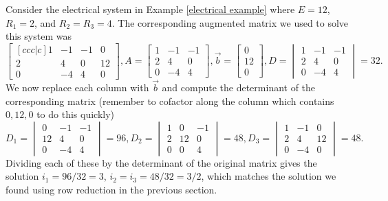 \begin{example}
Consider the electrical system in Example \ref{electrical example} where $E=12$, $R_1=2$, and $R_2=R_3=4$. 
The corresponding augmented matrix we used to solve this system was 
$$
\begin{bmatrix}[ccc|c]
1&-1&-1&0\\
2&4&0&12\\
0&-4&4&0
\end{bmatrix}, 
A=
\begin{bmatrix}1&-1&-1\\2&4&0\\0&-4&4\end{bmatrix}, 
\vec b=\begin{bmatrix}
0\\
12\\
0
\end{bmatrix},D=\begin{vmatrix} 1&-1&-1\\2&4&0\\0&-4&4 \end {vmatrix} =32. 
$$ 
We now replace each column with $\vec b$ and compute the determinant of the corresponding matrix (remember to cofactor along the column which contains $0,12,0$ to do this quickly)
$$ 
D_1=\begin{vmatrix} 0&-1&-1\\12&4&0\\0&-4&4 \end {vmatrix} =96,
D_2=\begin{vmatrix} 1&0&-1\\2&12&0\\0&0&4 \end {vmatrix} =48, 
D_3=\begin{vmatrix} 1&-1&0\\2&4&12\\0&-4&0 \end {vmatrix} =48. 
$$
Dividing each of these by the determinant of the original matrix gives the solution $i_1 = 96/32 = 3$, $i_2=i_3=48/32 = 3/2$, which matches the solution we found using row reduction in the previous section. 
\end{example}



















